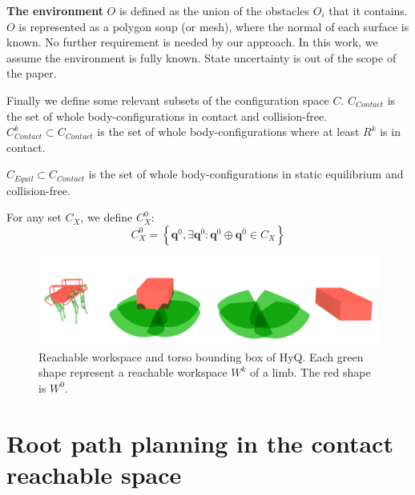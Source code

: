 \documentclass[journal]{IEEEtran}
\begin{document}

\medskip
\textbf{The environment} $O$ is defined as the union of the obstacles $O_i$ that it contains. $O$ is represented
as a polygon soup (or mesh), where the normal of each surface is known. No further requirement is needed
by our approach. In this work, we assume the environment is fully known. State uncertainty is out of the scope of the paper.

\medskip
Finally we define some relevant subsets of the configuration space $C$.
$C_{Contact}$ is the set of whole body-configurations in contact and collision-free.
$C_{Contact}^k \subset C_{Contact}$ is the set of whole body-configurations where at least $R^k$ is in contact.

\medskip
$C_{Equil} \subset C_{Contact}$ is the set of whole body-configurations in static equilibrium and collision-free.

\medskip
For any set $C_{X}$, we define $C_{X}^0$:
\begin{equation*}
  C_{X}^0 = \left\{ \mathbf{q}^{0},  \exists \mathbf{q}^{\overline{0}}: \mathbf{q}^0  \oplus \mathbf{q}^{\overline{0}} \in C_{X} \right\}
\end{equation*}

\begin{figure}
  \centering
  \includegraphics[width=1\linewidth]{figures/HyQ_roms}
  \caption{
           Reachable workspace and torso bounding box of HyQ. Each green shape represent a reachable workspace $W^k$ of a limb. The red shape is $W^0$.}
		   \label{fig:HyQ_roms}
\end{figure}
\section{Root path planning in the contact reachable space}
\label{rbprm}
\end{document}
